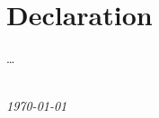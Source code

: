 \thispagestyle{empty}

\chapter*{Declaration}

\noindent
\dots

\vspace{1cm}

\begin{flushright}
\textit{\student}\\
\textit{\today}
\end{flushright}